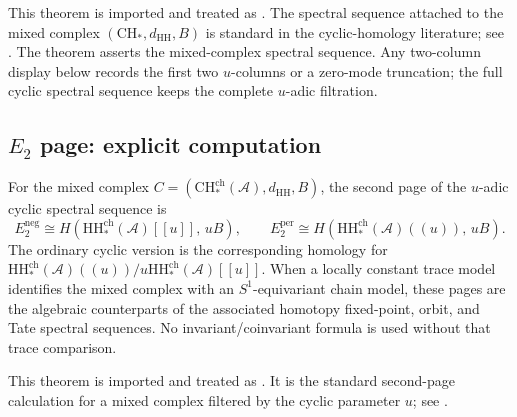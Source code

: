 \begin{remark}
This theorem is imported and treated as \ClaimStatusProvedElsewhere. The
spectral sequence attached to the mixed complex $(\mathrm{CH}_*,d_{\mathrm{HH}},B)$
is standard in the cyclic-homology literature; see \cite{Connes85,Loday98}.
The theorem asserts the mixed-complex spectral sequence. Any two-column
display below records the first two $u$-columns or a zero-mode
truncation; the full cyclic spectral sequence keeps the complete
$u$-adic filtration.
\end{remark}

\subsection{\texorpdfstring{$E_2$ page: explicit computation}{E2 page: explicit computation}}

\begin{theorem}
\label{thm:E2-page-formula}
For the mixed complex
$C=(\mathrm{CH}^{\mathrm{ch}}_*(\mathcal A),d_{\mathrm{HH}},B)$, the
second page of the $u$-adic cyclic spectral sequence is
\[
E_2^{\mathrm{neg}}
\cong
H\!\left(\mathrm{HH}^{\mathrm{ch}}_*(\mathcal A)[[u]],\,uB\right),
\qquad
E_2^{\mathrm{per}}
\cong
H\!\left(\mathrm{HH}^{\mathrm{ch}}_*(\mathcal A)((u)),\,uB\right).
\]
The ordinary cyclic version is the corresponding homology for
$\mathrm{HH}^{\mathrm{ch}}_*(\mathcal A)((u))/u\mathrm{HH}^{\mathrm{ch}}_*(\mathcal A)[[u]]$.
When a locally constant trace model identifies the mixed complex with
an $S^1$-equivariant chain model, these pages are the algebraic
counterparts of the associated homotopy fixed-point, orbit, and Tate
spectral sequences. No invariant/coinvariant formula is used without
that trace comparison.
\end{theorem}

\begin{remark}
This theorem is imported and treated as \ClaimStatusProvedElsewhere. It
is the standard second-page calculation for a mixed complex filtered by
the cyclic parameter $u$; see \cite{Loday98}.
\end{remark}

